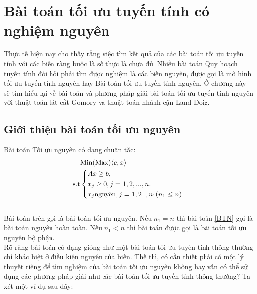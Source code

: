 \documentclass[12pt,a4paper]{report}
\begin{document}
\chapter{Bài toán tối ưu tuyến tính có nghiệm nguyên}
Thực tế hiện nay cho thấy rằng việc tìm kết quả của các bài toán tối ưu tuyến tính với các biến ràng buộc là số thực là chưa đủ. Nhiều bài toán Quy hoạch tuyến tính đòi hỏi phải tìm được nghiệm là các biến nguyên, được gọi là mô hình tối ưu tuyến tính nguyên hay Bài toán tối ưu tuyến tính nguyên. Ở chương này sẽ tìm hiểu lại về bài toán và phương pháp giải bài toán tối ưu tuyến tính nguyên với  thuật toán lát cắt Gomory và thuật toán nhánh cận Land-Doig.

\section{Giới thiệu bài toán tối ưu nguyên}
Bài toán Tối ưu nguyên có dạng chuẩn tắc:\\
    \begin{equation}\label{BTN}
     \begin{split}
          & {\rm{Min (Max)}} \langle c,x \rangle\\
          \rm{s.t} &\left\{\begin{split}
            & Ax\ge b,\\
            & x_j \ge 0, j=1,2,...,n.\\
            & x_j \text{nguyên}, j=1,2..,n_1 (n_1\le n).\\
           \end{split}\right.
       \end{split}
   \end{equation}
   \\
   
 Bài toán trên gọi là bài toán tối ưu nguyên. Nếu $n_1=n$ thì bài toán \eqref{BTN} gọi là bài toán nguyên hoàn toàn. Nếu $n_1 <n$ thì bài toán được gọi là bài toán tối ưu nguyên bộ phận.\\
Rõ ràng bài toán có dạng giống như một bài toán tối ưu tuyến tính thông thường chỉ khác biệt ở điều kiện nguyên của biến. Thế thì, có cần thiết phải có một lý thuyết riêng để tìm nghiệm của bài toán tối ưu nguyên không hay vẫn có thể sử dụng các phương pháp giải như các bài toán tối ưu tuyến tính thông thường? Ta xét một ví dụ sau đây:\\
\end{document}
